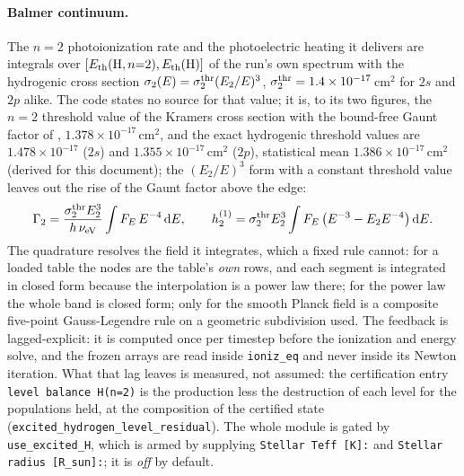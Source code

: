 \paragraph{Balmer continuum.} The $n=2$ photoionization rate and the
photoelectric heating it delivers are integrals over
$[E_{\rm th}({\rm H},n{=}2), E_{\rm th}({\rm H})]$ of the run's own
spectrum with the hydrogenic cross section
$\sigma_2(E) = \sigma_2^{\rm thr}(E_2/E)^{3}$,
$\sigma_2^{\rm thr} = 1.4\times10^{-17}$\,cm$^{2}$ for $2s$ and $2p$ alike. The
code states no source for that value; it is, to its two figures, the $n=2$
threshold value of the Kramers cross section with the bound-free Gaunt
factor of \citet[eqs.~3 and 10]{Seaton1959}, $1.378\times10^{-17}$\,cm$^{2}$,
and the exact hydrogenic threshold values are $1.478\times10^{-17}$ ($2s$) and
$1.355\times10^{-17}$\,cm$^{2}$ ($2p$), statistical mean
$1.386\times10^{-17}$\,cm$^{2}$ (derived for this document); the $(E_2/E)^3$
form with a constant threshold value leaves out the rise of the Gaunt factor
above the edge:
\begin{equation}
\Gamma_2 = \frac{\sigma_2^{\rm thr}E_2^{3}}{h\,\nu_{\rm eV}}
           \int F_E\,E^{-4}\,{\rm d}E,
\qquad
h^{(1)}_2 = \sigma_2^{\rm thr}E_2^{3}
           \int F_E\left(E^{-3}-E_2E^{-4}\right){\rm d}E.
\label{eq:ion:balmer}
\end{equation}
The quadrature resolves the field it integrates, which a fixed rule cannot:
for a loaded table the nodes are the table's \emph{own} rows, and each
segment is integrated in closed form because the interpolation is a power
law there; for the power law the whole band is closed form; only for the
smooth Planck field is a composite five-point Gauss-Legendre rule on a
geometric subdivision used. The feedback is lagged-explicit: it is computed
once per timestep before the ionization and energy solve, and the frozen
arrays are read inside \texttt{ioniz\_eq} and never inside its Newton
iteration. What that lag leaves is measured, not assumed: the certification
entry \texttt{level balance H(n=2)} is the production less the destruction of
each level for the populations held, at the composition of the certified
state (\texttt{excited\_hydrogen\_level\_residual}). The whole module is gated by \texttt{use\_excited\_H}, which is
armed by supplying \texttt{Stellar Teff [K]:} and
\texttt{Stellar radius [R\_sun]:}; it is \emph{off} by default.

